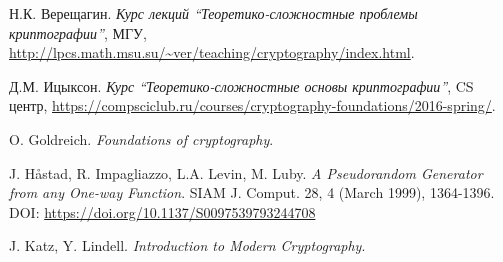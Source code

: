 \documentclass[12pt,a4paper]{article}
\theoremstyle{definition}
\theoremstyle{plain}
\theoremstyle{remark}
\begin{document}
\newpage
\begin{thebibliography}{9}
    
     Н.К. Верещагин. 
        \emph{Курс лекций ``Теоретико-сложностные проблемы криптографии''},
        МГУ, \url{http://lpcs.math.msu.su/~ver/teaching/cryptography/index.html}.
    
     Д.М. Ицыксон. \emph{Курс ``Теоретико-сложностные основы криптографии''}, 
        CS центр, \url{https://compsciclub.ru/courses/cryptography-foundations/2016-spring/}.

     O. Goldreich. \emph{Foundations of cryptography}.

     J. H\aa{}stad, R. Impagliazzo, L.A. Levin, M. Luby. 
        \emph{A Pseudorandom Generator from any One-way Function}.  
        SIAM J. Comput. 28, 4 (March 1999), 1364-1396.\\ 
        DOI: \url{https://doi.org/10.1137/S0097539793244708}
            
     J. Katz, Y. Lindell. \emph{Introduction to Modern Cryptography}.

\end{thebibliography}

\listoftodos
\end{document}
